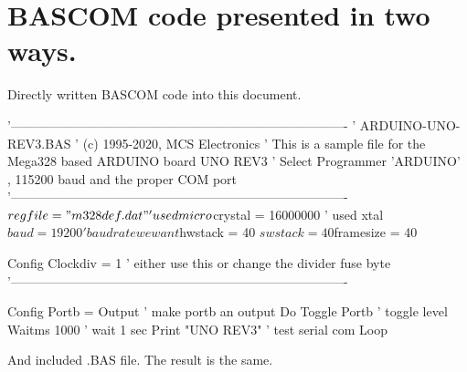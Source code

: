 \documentclass[10pt,a4paper]{article}
\begin{document}
\section{BASCOM code presented in two ways.}
Directly written BASCOM code into this document. 
\begin{Bascomlisting}
'-------------------------------------------------------------------------------
'                ARDUINO-UNO-REV3.BAS
'              (c) 1995-2020, MCS Electronics
'  This is a sample file for the Mega328 based ARDUINO board UNO REV3
'  Select Programmer 'ARDUINO' , 115200 baud and the proper COM port
'-------------------------------------------------------------------------------
$regfile = "m328def.dat"                                    ' used micro
$crystal = 16000000                                         ' used xtal
$baud = 19200                                               ' baud rate we want
$hwstack = 40
$swstack = 40
$framesize = 40

Config Clockdiv = 1                                         ' either use this or change the divider fuse byte
'-------------------------------------------------------------------------------

Config Portb = Output                                       ' make portb an output
Do
  Toggle Portb                                              ' toggle level
  Waitms 1000                                               ' wait 1 sec
  Print "UNO REV3"                                          ' test serial com
Loop
\end{Bascomlisting}

And included .BAS file. The result is the same.


\end{document}
